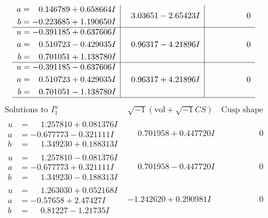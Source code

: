 \documentclass[1p]{elsarticle_modified}
\theoremstyle{definition}
\newcommand{\I}{\sqrt{-1}}
\begin{document}
$$\begin{array}{c|c|c}
\begin{aligned}
a &= \phantom{-}0.146789 + 0.658664 I \\
b &= -0.223685 + 1.190650 I\end{aligned}
 & \phantom{-}3.03651 - 2.65423 I & \phantom{-0.000000 } 0 \\ \hline\begin{aligned}
u &= -0.391185 + 0.637606 I \\
a &= \phantom{-}0.510723 - 0.429035 I \\
b &= \phantom{-}0.701051 + 1.138780 I\end{aligned}
 & \phantom{-}0.96317 - 4.21896 I & \phantom{-0.000000 } 0 \\ \hline\begin{aligned}
u &= -0.391185 - 0.637606 I \\
a &= \phantom{-}0.510723 + 0.429035 I \\
b &= \phantom{-}0.701051 - 1.138780 I\end{aligned}
 & \phantom{-}0.96317 + 4.21896 I & \phantom{-0.000000 } 0\\
 \hline 
 \end{array}$$\newpage$$\begin{array}{c|c|c}  
\text{Solutions to }I^u_{1}& \I (\text{vol} + \sqrt{-1}CS) & \text{Cusp shape}\\
 \hline 
\begin{aligned}
u &= \phantom{-}1.257810 + 0.081376 I \\
a &= -0.677773 - 0.321111 I \\
b &= \phantom{-}1.349230 + 0.188313 I\end{aligned}
 & \phantom{-}0.701958 + 0.447720 I & \phantom{-0.000000 } 0 \\ \hline\begin{aligned}
u &= \phantom{-}1.257810 - 0.081376 I \\
a &= -0.677773 + 0.321111 I \\
b &= \phantom{-}1.349230 - 0.188313 I\end{aligned}
 & \phantom{-}0.701958 - 0.447720 I & \phantom{-0.000000 } 0 \\ \hline\begin{aligned}
u &= \phantom{-}1.263030 + 0.052168 I \\
a &= -0.57658 + 2.47427 I \\
b &= \phantom{-}0.81227 - 1.21735 I\end{aligned}
 & -1.242620 + 0.290981 I & \phantom{-0.000000 } 0 \\ \hline\begin{aligned}

\end{aligned}
\end{array}$$
\end{document}
